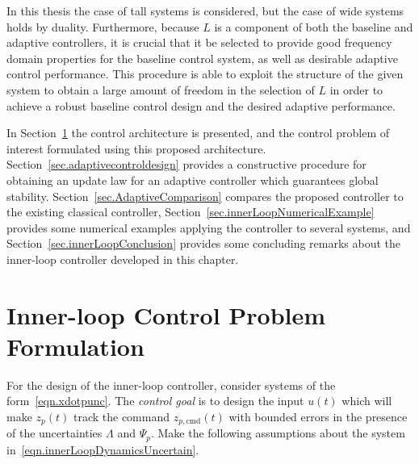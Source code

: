 In this thesis the case of tall systems is considered, but the case of wide systems holds by duality.
Furthermore, because $L$ is a component of both the baseline and adaptive controllers, it is crucial that it be selected to provide good frequency domain properties for the baseline control system, as well as desirable adaptive control performance.
This procedure is able to exploit the structure of the given system to obtain a large amount of freedom in the selection of $L$ in order to achieve a robust baseline control design and the desired adaptive performance.

In Section~\ref{sec.controlproblem} the control architecture is presented, and the control problem of interest formulated using this proposed architecture.
Section~\ref{sec.adaptivecontroldesign} provides a constructive procedure for obtaining an update law for an adaptive controller which guarantees global stability.
Section~\ref{sec.AdaptiveComparison} compares the proposed controller to the existing classical controller, Section~\ref{sec.innerLoopNumericalExample} provides some numerical examples applying the controller to several systems, and Section~\ref{sec.innerLoopConclusion} provides some concluding remarks about the inner-loop controller developed in this chapter.

\section{Inner-loop Control Problem Formulation}\label{sec.controlproblem}

For the design of the inner-loop controller, consider systems of the form\ \eqref{eqn.xdotpunc}.
The \textit{control goal} is to design the input $u(t)$ which will make $z_{p}(t)$ track the command $z_{p,\text{cmd}}(t)$ with bounded errors in the presence of the uncertainties $\Lambda$ and $\Psi_{p}$.
Make the following assumptions about the system in\ \eqref{eqn.innerLoopDynamicsUncertain}.

